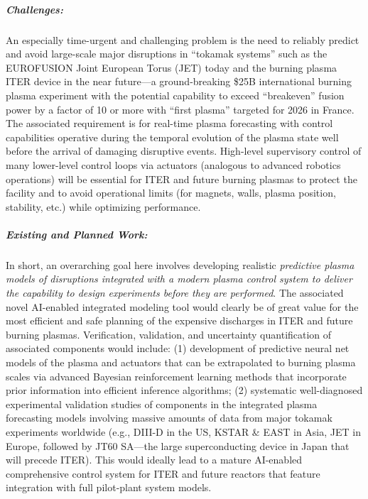 \subparagraph*{Challenges:} An especially time-urgent and challenging problem is the need to reliably predict and avoid large-scale major disruptions in “tokamak systems” such as the EUROFUSION Joint European Torus (JET) today and the burning plasma ITER device in the near future---a ground-breaking \$25B international burning plasma experiment with the potential capability to exceed “breakeven” fusion power by a factor of 10 or more with “first plasma” targeted for 2026 in France.  The associated requirement is for real-time plasma forecasting with control capabilities operative during the temporal evolution of the plasma state well before the arrival of damaging disruptive events.  
High-level supervisory control of many lower-level control loops via actuators (analogous to advanced robotics operations) will be essential for ITER and future burning plasmas to protect the facility and to avoid operational limits (for magnets, walls, plasma position, stability, etc.) while optimizing performance.   

\subparagraph*{Existing and Planned Work:} In short, an overarching goal here involves developing realistic \textit{predictive plasma models of disruptions integrated with a modern plasma control system to deliver the capability to design experiments before they are performed}. 
The associated novel AI-enabled integrated modeling tool would clearly be of great value for the most efficient and safe planning of the expensive discharges in ITER and future burning plasmas. 
Verification, validation, and uncertainty quantification of associated components would include: (1) development of predictive neural net models of the plasma and actuators that can be extrapolated to burning plasma scales via advanced Bayesian reinforcement learning methods that incorporate prior information into efficient inference algorithms; (2) systematic well-diagnosed experimental validation studies of components in the integrated plasma forecasting models involving massive amounts of data from major tokamak experiments worldwide (e.g., DIII-D in the US, KSTAR \& EAST in Asia, JET in Europe, followed by JT60 SA---the large superconducting device in Japan that will precede ITER).  
This would ideally lead to a mature AI-enabled comprehensive control system for ITER and future reactors that feature integration with full pilot-plant system models. 

